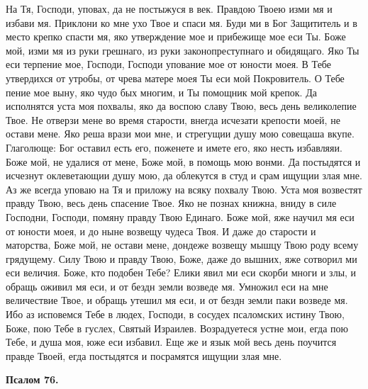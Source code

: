 На Тя, Господи, уповах, да не постыжуся в век. Правдою Твоею изми мя и избави мя. Приклони ко мне ухо Твое и спаси мя. Буди ми в Бог Защититель и в место крепко спасти мя, яко утверждение мое и прибежище мое еси Ты. Боже мой, изми мя из руки грешнаго, из руки законопреступнаго и обидящаго. Яко Ты еси терпение мое, Господи, Господи упование мое от юности моея. В Тебе утвердихся от утробы, от чрева матере моея Ты еси мой Покровитель. О Тебе пение мое выну, яко чудо бых многим, и Ты помощник мой крепок. Да исполнятся уста моя похвалы, яко да воспою славу Твою, весь день великолепие Твое. Не отверзи мене во время старости, внегда исчезати крепости моей, не остави мене. Яко реша врази мои мне, и стрегущии душу мою совещаша вкупе. Глаголюще: Бог оставил есть его, поженете и имете его, яко несть избавляяи. Боже мой, не удалися от мене, Боже мой, в помощь мою вонми. Да постыдятся и исчезнут оклеветающии душу мою, да облекутся в студ и срам ищущии злая мне. Аз же всегда уповаю на Тя и приложу на всяку похвалу Твою. Уста моя возвестят правду Твою, весь день спасение Твое. Яко не познах книжна, вниду в силе Господни, Господи, помяну правду Твою Единаго. Боже мой, яже научил мя еси от юности моея, и до ныне возвещу чудеса Твоя. И даже до старости и маторства, Боже мой, не остави мене, дондеже возвещу мышцу Твою роду всему грядущему. Силу Твою и правду Твою, Боже, даже до вышних, яже сотворил ми еси величия. Боже, кто подобен Тебе? Елики явил ми еси скорби многи и злы, и обращь оживил мя еси, и от бездн земли возведе мя. Умножил еси на мне величествие Твое, и обращь утешил мя еси, и от бездн земли паки возведе мя. Ибо аз исповемся Тебе в людех, Господи, в сосудех псаломских истину Твою, Боже, пою Тебе в гуслех, Святый Израилев. Возрадуетеся устне мои, егда пою Тебе, и душа моя, юже еси избавил. Еще же и язык мой весь день поучится правде Твоей, егда постыдятся и посрамятся ищущии злая мне.


\medskip


\bfseries Псалом 76.\normalfont{}\nopagebreak


